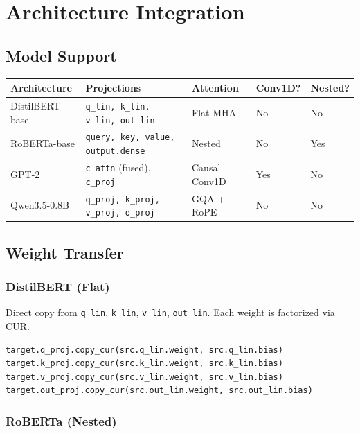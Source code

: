 
\section{Architecture Integration}

\subsection{Model Support}

\begin{table}[H]
\centering
\small
\begin{tabular}{lllll}
\toprule
\textbf{Architecture} & \textbf{Projections} & \textbf{Attention} & \textbf{Conv1D?} & \textbf{Nested?} \\
\midrule
DistilBERT-base & \texttt{q\_lin, k\_lin, v\_lin, out\_lin} & Flat MHA & No & No \\
RoBERTa-base & \texttt{query, key, value, output.dense} & Nested & No & Yes \\
GPT-2 & \texttt{c\_attn} (fused), \texttt{c\_proj} & Causal Conv1D & Yes & No \\
Qwen3.5-0.8B & \texttt{q\_proj, k\_proj, v\_proj, o\_proj} & GQA + RoPE & No & No \\
\bottomrule
\end{tabular}
\end{table}

\subsection{Weight Transfer}

\subsubsection{DistilBERT (Flat)}

Direct copy from \texttt{q\_lin}, \texttt{k\_lin}, \texttt{v\_lin}, \texttt{out\_lin}. Each weight is 
factorized via CUR.

\begin{lstlisting}
target.q_proj.copy_cur(src.q_lin.weight, src.q_lin.bias)
target.k_proj.copy_cur(src.k_lin.weight, src.k_lin.bias)
target.v_proj.copy_cur(src.v_lin.weight, src.v_lin.bias)
target.out_proj.copy_cur(src.out_lin.weight, src.out_lin.bias)
\end{lstlisting}

\subsubsection{RoBERTa (Nested)}

